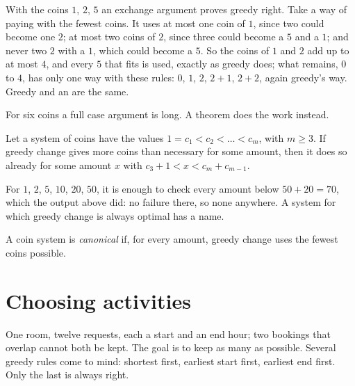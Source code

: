 With the coins $1$, $2$, $5$ an exchange argument proves greedy right. Take a way of paying with the fewest coins. It
uses at most one coin of $1$, since two could become one $2$; at most two coins of $2$, since three could become a $5$
and a $1$; and never two $2$ with a $1$, which could become a $5$. So the coins of $1$ and $2$ add up to at most $4$,
and every $5$ that fits is used, exactly as greedy does; what remains, $0$ to $4$, has only one way with these rules:
$0$, $1$, $2$, $2 + 1$, $2 + 2$, again greedy's way. Greedy and an  are the same.

For six coins a full case argument is long. A theorem does the work instead.

\begin{theorem}\label{thm:g11:greedy-algorithms:kozen-zaks}
Let a system of coins have the values $1 = c_1 < c_2 < \dots < c_m$, with $m \ge 3$. If greedy change gives more
coins than necessary for some amount, then it does so already for some amount $x$ with $c_3 + 1 < x < c_m + c_{m-1}$.
\end{theorem}
\admitted

For $1$, $2$, $5$, $10$, $20$, $50$, it is enough to check every amount below $50 + 20 = 70$, which the output above
did: no failure there, so none anywhere. A system for which greedy change is always optimal has a name.

\begin{definition}\label{def:g11:greedy-algorithms:canonical}
A coin system is \emph{canonical} if, for every amount, greedy change uses the fewest
coins possible.
\end{definition}

\section{Choosing activities}\label{sec:g11:greedy-algorithms:activities}

One room, twelve requests, each a start and an end hour; two bookings that overlap cannot both be kept. The goal is to
keep as many as possible. Several greedy rules come to mind: shortest first, earliest start first, earliest end first.
Only the last is always right.

\label{lst:g11:greedy-algorithms:activities}

